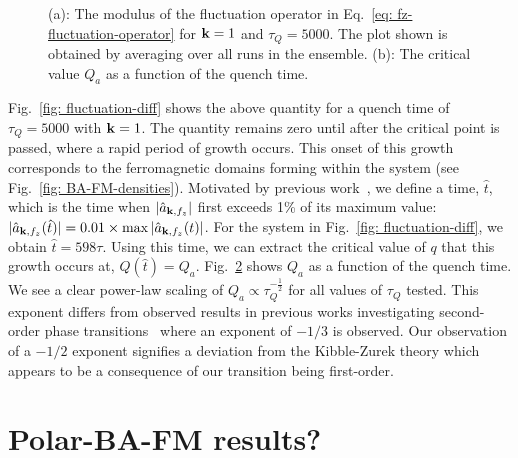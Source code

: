 \begin{figure}[tb]
\begin{subfigure}{0.45\textwidth}
        \caption{\label{fig: Q_a-scaling}}
    \end{subfigure}
    \caption[Growth of the fluctuation operator]
    {(a): The modulus of the fluctuation operator in
        Eq.~\eqref{eq: fz-fluctuation-operator} for \(\vb{k}=1\) and
        \(\tau_Q=5000\).
        The plot shown is obtained by averaging over all runs in the ensemble.
        (b): The critical value \(Q_a\) as a function of the quench time.
    }
\end{figure}
Fig.~\ref{fig: fluctuation-diff} shows the above quantity for a quench time
of \(\tau_Q=5000\) with \(\vb{k}=1\).
The quantity remains zero until after the critical point is passed, where
a rapid period of growth occurs.
This onset of this growth corresponds to the ferromagnetic domains forming
within the system (see Fig.~\ref{fig: BA-FM-densities}).
Motivated by previous work~\cite{Damski2007, Qiu2020}, we define a time,
\( \hat{t} \), which is the time when \(|\hat{a}_{\vb{k}, {f_z}}|\) first
exceeds 1\% of its maximum value: \(|\hat{a}_{\vb{k}, {f_z}}(\hat{t})| =
0.01\times \max|\hat{a}_{\vb{k}, {f_z}}(t)|\).
For the system in Fig.~\ref{fig: fluctuation-diff}, we obtain
\(\hat{t}=598\tau \).
Using this time, we can extract the critical value of \( q \) that this growth
occurs at, \(Q(\hat{t}) = Q_a\).
Fig.~\ref{fig: Q_a-scaling} shows \(Q_a\) as a function of the quench time.
We see a clear power-law scaling of \(Q_a \propto \tau_Q^{-\frac{1}{2}}\) for
all values of \( \tau_Q \) tested.
This exponent differs from observed results in previous works investigating
second-order phase transitions~\cite{Damski2007, Anquez2016, Swislocki2013}
where an exponent of \(-1/3\) is observed.
Our observation of a \(-1/2\) exponent signifies a deviation from
the Kibble-Zurek theory which appears to be a consequence of our transition
being first-order.

\section{Polar-BA-FM results?}
